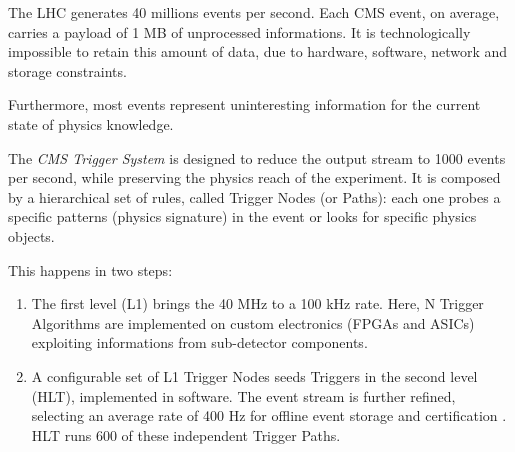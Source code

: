 The LHC generates 40 millions events per second. Each CMS event, on average, carries a payload of 1 MB of unprocessed informations. It is technologically impossible to retain this amount of data, due to hardware, software, network and storage constraints.

Furthermore, most events represent uninteresting information for the current state of physics knowledge.

The \textit{CMS Trigger System} is designed to reduce the output stream to 1000 events per second, while preserving the physics reach of the experiment.
It is composed by a hierarchical set of rules, called Trigger Nodes (or Paths): each one probes a specific patterns (physics signature) in the event or looks for specific physics objects.

This happens in two steps:

\begin{enumerate}

	\item The first level (L1) \cite{Bayatyan:706847} brings the 40 MHz to a 100 kHz rate. Here, N Trigger Algorithms are implemented on custom electronics (FPGAs and ASICs) exploiting informations from sub-detector components.

	\item A configurable set of L1 Trigger Nodes seeds Triggers in the second level (HLT), implemented in software. The event stream is further refined, selecting an average rate of 400 Hz for offline event storage and certification \cite{Khachatryan_2017}. HLT runs 600 of these independent Trigger Paths.

\end{enumerate}